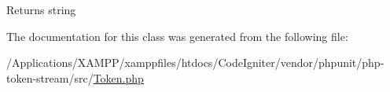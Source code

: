 \begin{DoxyReturn}{Returns}
string 
\end{DoxyReturn}


The documentation for this class was generated from the following file\+:\begin{DoxyCompactItemize}
\item 
/\+Applications/\+X\+A\+M\+P\+P/xamppfiles/htdocs/\+Code\+Igniter/vendor/phpunit/php-\/token-\/stream/src/\mbox{\hyperlink{_token_8php}{Token.\+php}}\end{DoxyCompactItemize}
